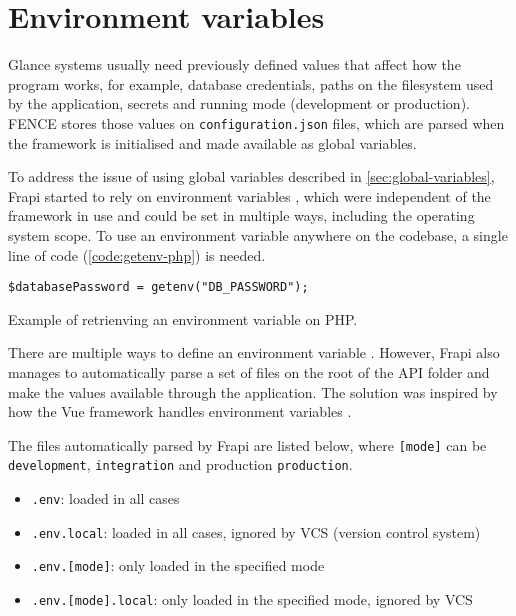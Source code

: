\section{Environment variables}

Glance systems usually need previously defined values that affect how the program works, for example, database credentials, paths on the filesystem used by the application, secrets and running mode (development or production). FENCE stores those values on \texttt{configuration.json} files, which are parsed when the framework is initialised and made available as global variables.

To address the issue of using global variables described in \autoref{sec:global-variables}, Frapi started to rely on environment variables \cite{frapi-environment-variables}, which were independent of the framework in use and could be set in multiple ways, including the operating system scope. To use an environment variable anywhere on the codebase, a single line of code (\autoref{code:getenv-php}) is needed.

\begin{listing}[htbp]
\begin{verbatim}
$databasePassword = getenv("DB_PASSWORD");
\end{verbatim}
\caption{Example of retrienving an environment variable on PHP.}
\label{code:getenv-php}
\end{listing}

There are multiple ways to define an environment variable \cite{defining-environment-variables}. However, Frapi also manages to automatically parse a set of files on the root of the API folder and make the values available through the application. The solution was inspired by how the Vue framework \cite{vue-about} handles environment variables \cite{vue-environment-variables}.

The files automatically parsed by Frapi are listed below, where \texttt{[mode]} can be \texttt{development}, \texttt{integration} and production \texttt{production}.

\begin{itemize}
    \item \texttt{.env}: loaded in all cases
    \item \texttt{.env.local}: loaded in all cases, ignored by VCS (version control system)
    \item \texttt{.env.[mode]}: only loaded in the specified mode
    \item \texttt{.env.[mode].local}: only loaded in the specified mode, ignored by VCS
\end{itemize}

